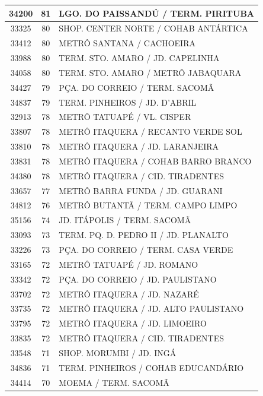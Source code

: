 \documentclass[
	12pt,				%
	oneside,			%
	a4paper,			%
	english,			%
	brazil				%
	]{abntex2ppgsi}
\begin{document}
\begin{apendicesenv}
\begin{longtable}{c|c|p{7cm}}
\hline
    34200 & 81    & LGO. DO PAISSANDÚ / TERM. PIRITUBA \\
\hline
    33325 & 80    & SHOP. CENTER NORTE / COHAB ANTÁRTICA \\
\hline
    33412 & 80    & METRÔ SANTANA / CACHOEIRA \\
\hline
    33988 & 80    & TERM. STO. AMARO / JD. CAPELINHA \\
\hline
    34058 & 80    & TERM. STO. AMARO / METRÔ JABAQUARA \\
\hline
    34427 & 79    & PÇA. DO CORREIO / TERM. SACOMÃ \\
\hline
    34837 & 79    & TERM. PINHEIROS / JD. D'ABRIL \\
\hline
    32913 & 78    & METRÔ TATUAPÉ / VL. CISPER \\
\hline
    33807 & 78    & METRÔ ITAQUERA / RECANTO VERDE SOL \\
\hline
    33810 & 78    & METRÔ ITAQUERA / JD. LARANJEIRA \\
\hline
    33831 & 78    & METRÔ ITAQUERA / COHAB BARRO BRANCO \\
\hline
    34380 & 78    & METRÔ ITAQUERA / CID. TIRADENTES \\
\hline
    33657 & 77    & METRÔ BARRA FUNDA / JD. GUARANI \\
\hline
    34812 & 76    & METRÔ BUTANTÃ / TERM. CAMPO LIMPO \\
\hline
    35156 & 74    & JD. ITÁPOLIS / TERM. SACOMÃ \\
\hline
    33093 & 73    & TERM. PQ. D. PEDRO II / JD. PLANALTO \\
\hline
    33226 & 73    & PÇA. DO CORREIO / TERM. CASA VERDE \\
\hline
    33165 & 72    & METRÔ TATUAPÉ / JD. ROMANO \\
\hline
    33342 & 72    & PÇA. DO CORREIO / JD. PAULISTANO \\
\hline
    33702 & 72    & METRÔ ITAQUERA / JD. NAZARÉ \\
\hline
    33735 & 72    & METRÔ ITAQUERA / JD. ALTO PAULISTANO \\
\hline
    33795 & 72    & METRÔ ITAQUERA / JD. LIMOEIRO \\
\hline
    33835 & 72    & METRÔ ITAQUERA / CID. TIRADENTES \\
\hline
    33548 & 71    & SHOP. MORUMBI / JD. INGÁ \\
\hline
    34836 & 71    & TERM. PINHEIROS / COHAB EDUCANDÁRIO \\
\hline
    34414 & 70    & MOEMA / TERM. SACOMÃ \\

\end{longtable}
\end{apendicesenv}
\end{document}
